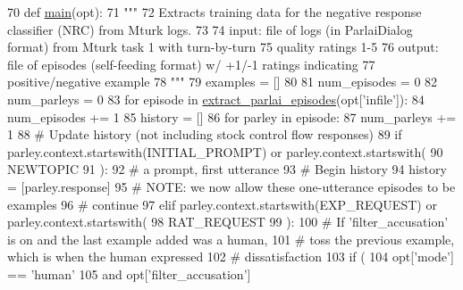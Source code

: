 \begin{DoxyCode}
70 \textcolor{keyword}{def }\hyperlink{namespaceprojects_1_1self__feeding_1_1scripts_1_1convert__chatted__to__unfiltered_a1fc60d6ff016ace4fb6d348542ae6e86}{main}(opt):
71     \textcolor{stringliteral}{"""}
72 \textcolor{stringliteral}{    Extracts training data for the negative response classifier (NRC) from Mturk logs.}
73 \textcolor{stringliteral}{}
74 \textcolor{stringliteral}{    input: file of logs (in ParlaiDialog format) from Mturk task 1 with turn-by-turn}
75 \textcolor{stringliteral}{        quality ratings 1-5}
76 \textcolor{stringliteral}{    output: file of episodes (self-feeding format) w/ +1/-1 ratings indicating}
77 \textcolor{stringliteral}{        positive/negative example}
78 \textcolor{stringliteral}{    """}
79     examples = []
80 
81     num\_episodes = 0
82     num\_parleys = 0
83     \textcolor{keywordflow}{for} episode \textcolor{keywordflow}{in} \hyperlink{namespaceprojects_1_1self__feeding_1_1utils_a7bfa2fe610a2d0da7968b1a2662e0c23}{extract\_parlai\_episodes}(opt[\textcolor{stringliteral}{'infile'}]):
84         num\_episodes += 1
85         history = []
86         \textcolor{keywordflow}{for} parley \textcolor{keywordflow}{in} episode:
87             num\_parleys += 1
88             \textcolor{comment}{# Update history (not including stock control flow responses)}
89             \textcolor{keywordflow}{if} parley.context.startswith(INITIAL\_PROMPT) \textcolor{keywordflow}{or} parley.context.startswith(
90                 NEWTOPIC
91             ):
92                 \textcolor{comment}{# a prompt, first utterance}
93                 \textcolor{comment}{# Begin history}
94                 history = [parley.response]
95                 \textcolor{comment}{# NOTE: we now allow these one-utterance episodes to be examples}
96                 \textcolor{comment}{# continue}
97             \textcolor{keywordflow}{elif} parley.context.startswith(EXP\_REQUEST) \textcolor{keywordflow}{or} parley.context.startswith(
98                 RAT\_REQUEST
99             ):
100                 \textcolor{comment}{# If 'filter\_accusation' is on and the last example added was a human,}
101                 \textcolor{comment}{# toss the previous example, which is when the human expressed}
102                 \textcolor{comment}{# dissatisfaction}
103                 \textcolor{keywordflow}{if} (
104                     opt[\textcolor{stringliteral}{'mode'}] == \textcolor{stringliteral}{'human'}
105                     \textcolor{keywordflow}{and} opt[\textcolor{stringliteral}{'filter\_accusation'}]

\end{DoxyCode}
